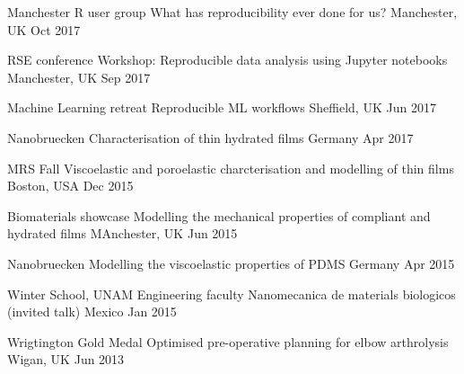 \begin{cvpresentations}


\cvpresentation
{Manchester R user group} %
{What has reproducibility ever done for us?} %
{Manchester, UK} %
{Oct 2017} %



\cvpresentation
{RSE conference} %
{Workshop: Reproducible data analysis using Jupyter notebooks} %
{Manchester, UK} %
{Sep 2017} %




\cvpresentation
{Machine Learning retreat} %
{Reproducible ML workflows} %
{Sheffield, UK} %
{Jun 2017} %



\cvpresentation
{Nanobruecken }
{Characterisation of thin hydrated films}
{Germany}
{Apr 2017}


\cvpresentation
{MRS Fall }
{Viscoelastic and poroelastic charcterisation and modelling of thin films}
{Boston, USA}
{Dec 2015}


\cvpresentation
{Biomaterials showcase}
{Modelling the mechanical properties of compliant and hydrated films}
{MAnchester, UK}
{Jun 2015}


\cvpresentation
{Nanobruecken }
{Modelling the viscoelastic properties of PDMS}
{Germany}
{Apr 2015}


\cvpresentation
{Winter School, UNAM Engineering faculty}
{Nanomecanica de materials biologicos (invited talk)}
{Mexico}
{Jan 2015}


\cvpresentation
{Wrigtington Gold Medal}
{Optimised pre-operative planning for elbow arthrolysis}
{Wigan, UK}
{Jun 2013}

\end{cvpresentations}